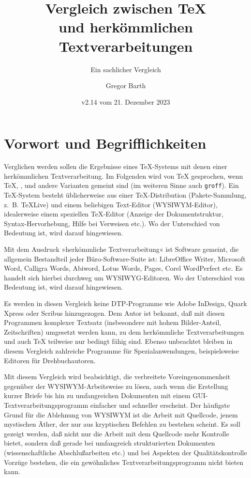 \documentclass[11pt,a4paper,ngerman,DIV=8]{scrartcl}
\title{Vergleich zwischen \TeX{}\\und herkömmlichen Textverarbeitungen}
\subtitle{Ein sachlicher Vergleich}
\author{Gregor Barth}
\date{v2.14 vom 21. Dezember 2023}
\begin{document}
\maketitle

\tableofcontents

\section{Vorwort und Begrifflichkeiten}

Verglichen werden sollen die Ergebnisse eines \TeX{}-Systems mit denen einer herkömmlichen Textverarbeitung. Im Folgenden wird von \TeX{} gesprochen, wenn \TeX{}, \XeTeX{}, \LuaTeX{} und andere Varianten gemeint sind (im weiteren Sinne auch \texttt{groff}). Ein \TeX{}-System besteht üblicherweise aus einer \TeX{}-Distribution (Pakete-Sammlung, z.~B. TeXLive) und einem beliebigen Text-Editor (WYSIWYM-Editor), idealerweise einem speziellen \TeX{}-Editor (Anzeige der Dokumentstruktur, Syntax-Hervorhebung, Hilfe bei Verweisen etc.). Wo der Unterschied von Bedeutung ist, wird darauf hingewiesen.

Mit dem Ausdruck »herkömmliche Textverarbeitung« ist Software gemeint, die allgemein Bestandteil jeder Büro-Software-Suite ist: LibreOffice Writer, Microsoft Word, Calligra Words, Abiword, Lotus Words, Pages, Corel WordPerfect etc. Es handelt sich hierbei durchweg um WYSIWYG-Editoren. Wo der Unterschied von Bedeutung ist, wird darauf hingewiesen.

Es werden in diesen Vergleich keine DTP-Programme wie Adobe InDesign, Quark Xpress oder Scribus hinzugezogen. Dem Autor ist bekannt, daß mit diesen Programmen komplexer Textsatz (insbesondere mit hohem Bilder-Anteil, Zeitschriften) umgesetzt werden kann, zu dem herkömmliche Textverarbeitungen und auch \TeX{} teilweise nur bedingt fähig sind. Ebenso unbeachtet bleiben in diesem Vergleich zahlreiche Programme für Spezialanwendungen, beispielsweise Editoren für Drehbuchautoren.

Mit diesem Vergleich wird beabsichtigt, die verbreitete Voreingenommenheit gegenüber der WYSIWYM-Arbeitsweise zu lösen, auch wenn die Erstellung kurzer Briefe bis hin zu umfangreichen Dokumenten mit einem GUI-Textverarbeitungsprogramm einfacher und schneller erscheint. Der häufigste Grund für die Ablehnung von WYSIWYM ist die Arbeit mit Quellcode, jenem mystischen Äther, der nur aus kryptischen Befehlen zu bestehen scheint. Es soll gezeigt werden, daß nicht nur die Arbeit mit dem Quellcode mehr Kontrolle bietet, sondern daß gerade bei umfangreich strukturierten Dokumenten (wissenschaftliche Abschlußarbeiten etc.) und bei Aspekten der Qualitätskontrolle Vorzüge bestehen, die ein gewöhnliches Textverarbeitungsprogramm nicht bieten kann.
\end{document}
